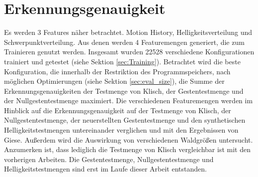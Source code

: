 \section{Erkennungsgenauigkeit}
Es werden 3 Features näher betrachtet. Motion History, Helligkeitsverteilung und Schwerpunktverteilung. Aus denen werden 4 Featuremengen generiert, die zum Trainieren genutzt werden. Insgesamt wurden 22528
verschiedene Konfigurationen trainiert und getestet (siehe Sektion \ref{sec:Training}).
\newline
\newline
Betrachtet wird die beste Konfiguration, die innerhalb der Restriktion des Programmspeichers, nach möglichen Optimierungen (siehe Sektion \ref{sec:eval_size}), die Summe der Erkennungsgenauigkeiten
der Testmenge von Klisch, der Gestentestmenge und der Nullgestentestmenge maximiert.
\newline
\newline
Die verschiedenen Featuremengen werden im Hinblick auf die Erkennungsgenauigkeit auf der Testmenge von Klisch, der Nullgestentestmenge, der neuerstellten Gestentestmenge und den synthetischen
Helligkeitstestmengen untereinander verglichen und mit den Ergebnissen von Giese. Außerdem wird die Auswirkung von verschiedenen Waldgrößen untersucht. Anzumerken ist, dass lediglich die
Testmenge von Klisch vergleichbar ist mit den vorherigen Arbeiten. Die Gestentestmenge, Nullgestentestmenge und Helligkeitstestmengen sind erst im Laufe dieser Arbeit entstanden.







